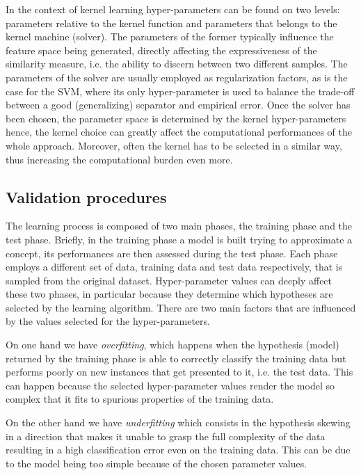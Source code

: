 In the context of kernel learning hyper-parameters can be found on two levels:
parameters relative to the kernel function and parameters that belongs to the
kernel machine (solver).
The parameters of the former typically influence the feature space being generated,
directly affecting the expressiveness of the similarity measure, i.e. the ability
to discern between two different samples.
The parameters of the solver are usually employed as regularization factors,
as is the case for the SVM, where its only hyper-parameter is used to balance the trade-off between a good
(generalizing) separator and empirical error.
Once the solver has been chosen, the parameter space is determined by the kernel
hyper-parameters hence, the kernel choice can greatly affect the computational
performances of the whole approach.
Moreover, often the kernel has to be selected in a similar way, thus increasing the
computational burden even more.

\subsection{Validation procedures}
The learning process is composed of two main phases, the training phase and
the test phase.
Briefly, in the training phase a model is built trying to approximate a concept, its performances
are then assessed during the test phase.
Each phase employs a different set of data, training data and test data respectively,
that is sampled from the original dataset.
Hyper-parameter values can deeply affect these two phases, in particular
because they determine which hypotheses are selected by the learning algorithm.
There are two main factors that are influenced by the values selected for the
hyper-parameters.

On one hand we have \emph{overfitting}, which happens when the hypothesis
(model) returned by the training phase is able to correctly classify the training data
but performs poorly on new instances that get presented to it, i.e. the test data.
This can happen because the selected hyper-parameter values render the model so
complex that it fits to spurious properties of the training data.

On the other hand we have \emph{underfitting} which consists in the hypothesis skewing
in a direction that makes it unable to grasp the full complexity of the data resulting
in a high classification error even on the training data.
This can be due to the model being too simple because of the chosen parameter values. 

